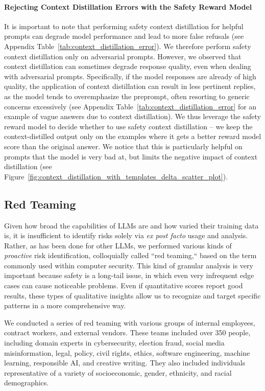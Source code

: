 \paragraph{Rejecting Context Distillation Errors with the Safety Reward Model} It is important to note that performing safety context distillation for helpful prompts can degrade model performance and lead to more false refusals (see Appendix Table~\ref{tab:context_distillation_error}). 
We therefore perform safety context distillation only on adversarial prompts. However, we observed that context distillation can sometimes degrade response quality, even when dealing with adversarial prompts. Specifically, if the model responses are already of high quality, the application of context distillation can result in less pertinent replies, as the model tends to overemphasize the preprompt, often resorting to generic concerns excessively (see Appendix Table~\ref{tab:context_distillation_error} for an example of vague answers due to context distillation). We thus leverage the safety reward model to decide whether to use safety context distillation -- we keep the context-distilled output only on the examples where it gets a better reward model score than the original answer. We notice that this is particularly helpful on prompts that the model is very bad at, but limits the negative impact of context distillation (see Figure~\ref{fig:context_distillation_with_templates_delta_scatter_plot}).

\subsection{Red Teaming}
\label{sec:red_teaming}

Given how broad the capabilities of LLMs are and how varied their training data is, it is insufficient to identify risks solely via {\em ex post facto} usage and analysis. Rather, as has been done for other LLMs, we performed various kinds of {\em proactive} risk identification, colloquially called ``red teaming,`` based on the term commonly used within computer security. This kind of granular analysis is very important because safety is a long-tail issue, in which even very infrequent edge cases can cause noticeable problems. Even if quantitative scores report good results, these types of qualitative insights allow us to recognize and target specific patterns in a more comprehensive way.

We conducted a series of red teaming with various groups of internal employees, contract workers, and external vendors. These teams included over 350 people, including domain experts in cybersecurity, election fraud, social media misinformation, legal, policy, civil rights, ethics, software engineering, machine learning, responsible AI, and creative writing. They also included individuals representative of a variety of socioeconomic, gender, ethnicity, and racial demographics.

